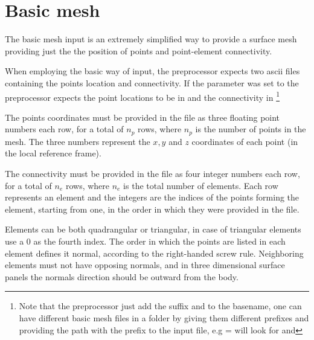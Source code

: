 \section{Basic mesh}
\label{subsec:Basic_Mesh}

The basic mesh input is an extremely simplified way to provide a surface mesh providing just the the 
position of points and point-element connectivity. 

When employing the basic way of input, the preprocessor expects two ascii files containing the points 
location and connectivity. If the parameter  was set to  the 
preprocessor expects the point locations to be in  and the connectivity 
in  \footnote{Note that the preprocessor just add the suffix  
and  to the basename, one can have different basic mesh files in a folder by giving them 
different prefixes and providing the path with the prefix to the input file, e.g 
 =  will look for  
and }

The points coordinates must be provided in the  file as three floating point numbers 
each row, for a total of $n_p$ rows, where $n_p$ is the number of points in the mesh. The three 
numbers represent the $x, y$ and $z$ coordinates of each point (in the local reference frame).

The connectivity must be provided in the  file as four integer numbers each row, for 
a total of $n_e$ rows, where $n_e$ is the total number of elements. Each row represents an element 
and the integers are the indices of the points forming the element, starting from one, in the order 
in which they were provided in the  file.

Elements can be both quadrangular or triangular, in case of triangular elements use a 0 
as the fourth index. The order in which the points are listed in each element defines it 
normal, according to the right-handed screw rule. Neighboring elements must not have opposing 
normals, and in three dimensional surface panels the normals direction should be outward from the body. 


